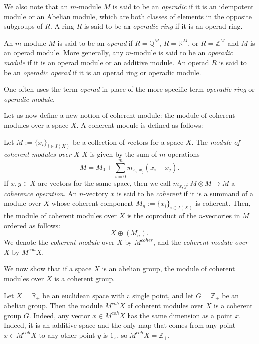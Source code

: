 \documentclass[a4paper,reqno,oneside]{article}
\begin{document}
We also note that an $m$-module $M$ is said to be an \textit{operadic} if it is an idempotent module or an Abelian module, which are both classes of elements in the opposite subgroups of $R$. A ring $R$ is said to be an \textit{operadic ring} if it is an operad ring.

An $m$-module $M$ is said to be an \textit{operad} if $R = \mathbb{Q}^M$, $R = \mathbb{R}^M$, or $R = \mathbb{Z}^M$ and $M$ is an operad module. More generally, any $m$-module is said to be an \textit{operadic module} if it is an operad module or an additive module. An operad $R$ is said to be an \textit{operadic operad} if it is an operad ring or operadic module.

One often uses the term \textit{operad} in place of the more specific term \textit{operadic ring} or \textit{operadic module}.

%


Let us now define a new notion of coherent module: the module of coherent modules over a space $X$. A coherent module is defined as follows:
%
\begin{definition}
	Let $M := \{x_i\}_{i \in I(X)}$ be a collection of vectors for a space $X$. The \textit{module of coherent modules over $X$} $X$ is given by the sum of $m$ operations
	\[
	M = M_0 + \sum_{i=0}^m m_{x_i, x_j} (x_i - x_j).
	\]
	If $x, y \in X$ are vectors for the same space, then we call $m_{x,y} : M \otimes M \to M$ a \textit{coherence operation}.
	An $n$-vectory $x$ is said to be \textit{coherent} if it is a summand of a module over $X$ whose coherent component $M_n := \{x_i\}_{i \in I(X)}$ is coherent.
	Then, the module of coherent modules over $X$ is the coproduct of the $n$-vectories in $M$ ordered as follows:
	\[
	X \oplus (M_n).
	\]
	We denote the \textit{coherent module} over $X$ by $M^{coher}$, and the \textit{coherent module over $X$} by $M^{coh}X$.
\end{definition}

We now show that if a space $X$ is an abelian group, the module of coherent modules over $X$ is a coherent group.

\begin{example}
	Let $X = \mathbb{R}_+$ be an euclidean space with a single point, and let $G = \mathbb{Z}_+$ be an abelian group. Then the module $M^{coh}X$ of coherent modules over $X$ is a coherent group $G$. Indeed, any vector $x \in M^{coh}X$ has the same dimension as a point $x$. Indeed, it is an additive space and the only map that comes from any point $x \in M^{coh}X$ to any other point $y$ is $1_x$, so $M^{coh}X = \mathbb{Z}_+$.
\end{example}
\end{document}
